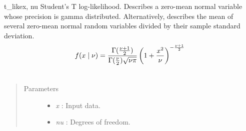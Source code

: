 \hypertarget{pymc.distributions.t_like}{}\begin{funcdesc}{t\_like}{x, nu}
Student's T log-likelihood. Describes a zero-mean normal variable whose precision is
gamma distributed. Alternatively, describes the mean of several zero-mean normal
random variables divided by their sample standard deviation.
\begin{gather}
\begin{split}f(x \mid \nu) = \frac{\Gamma(\frac{\nu+1}{2})}{\Gamma(\frac{\nu}{2}) \sqrt{\nu\pi}} \left( 1 + \frac{x^2}{\nu} \right)^{-\frac{\nu+1}{2}}\end{split}\notag\\\begin{split}\end{split}\notag
\end{gather}\begin{quote}\begin{description}
\item[Parameters] \leavevmode\begin{itemize}
\item {} 
\emph{x} : Input data.

\item {} 
\emph{nu} : Degrees of freedom.

\end{itemize}

\end{description}\end{quote}
\end{funcdesc}

